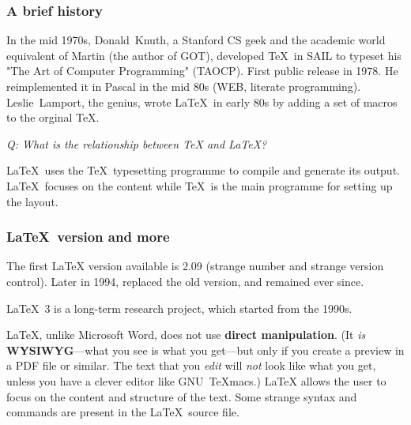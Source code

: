 \documentclass[11pt]{beamer}
\begin{document}
\begin{frame}
	\frametitle{A brief history}

	In the mid 1970s, Donald~Knuth, a Stanford CS geek and the academic world equivalent of Martin (the author of GOT), developed \TeX \ in SAIL to typeset his "The Art of Computer Programming" (TAOCP). First public release in 1978. He reimplemented it in Pascal in the mid 80s (WEB, literate programming).  Leslie~Lamport, the genius, wrote \LaTeX \ in early 80s by adding a set of macros to the orginal \TeX. 
	
	\bigskip
	
\textit{Q: What is the relationship between \TeX \xspace and \LaTeX? }
	
	\LaTeX \ uses the \TeX \ typesetting programme to compile and generate its output. \LaTeX \ focuses on the content while \TeX \ is the main programme for setting up the layout.

\end{frame}

\begin{frame}
	\frametitle{\LaTeX \ version and more}
	
	The first \LaTeX\xspace version available is 2.09 (strange number and strange version control). Later in 1994, \LaTeXe\xspace replaced the old version, and remained ever since. 
	
	\bigskip
	
	\LaTeX \ 3 is a long-term research project, which started from the 1990s.
	
	\bigskip
	
	\LaTeX, unlike Microsoft Word, does not use \textbf{direct manipulation}.  (It {\em is} \textbf{WYSIWYG}---what you see is what you get---but only if you create a preview in a PDF file or similar.  The text that you {\em edit} will {\em not} look like what you get, unless you have a clever editor like GNU~TeXmacs.)  \LaTeX{} allows the user to focus on the content and structure of the text. Some strange syntax and commands are present in the \LaTeX \ source file. 
	
\end{frame}
\end{document}
